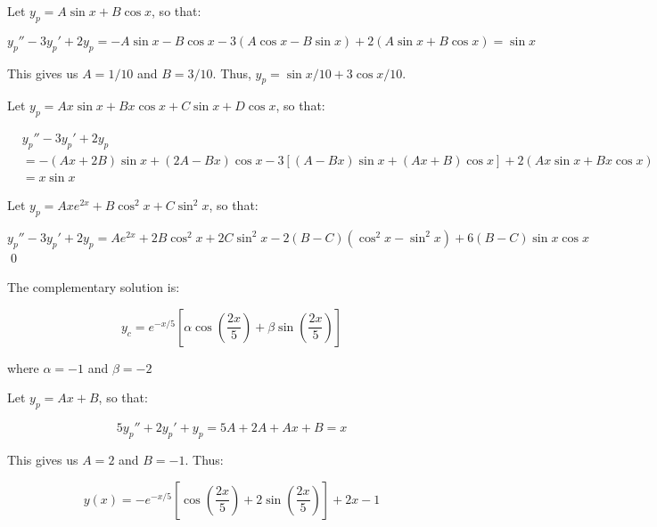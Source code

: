 \documentclass[12pt]{article}
\begin{document}
Let $y_{p} = A\sin{x} + B\cos{x}$, so that:

\begin{equation}
    y_{p}'' - 3y_{p}' + 2y_{p} = -A\sin{x} - B\cos{x} - 3(A\cos{x} - B\sin{x}) + 2(A\sin{x} + B\cos{x}) = \sin{x}
\end{equation}

This gives us $A = 1/10$ and $B = 3/10$. Thus, $y_{p} = \sin{x}/10 + 3\cos{x}/10$.

Let $y_{p} = Ax \sin{x} + Bx \cos{x} + C\sin{x} + D\cos{x}$, so that:

\begin{equation}
    \begin{split}
        &y_{p}'' - 3y_{p}' + 2y_{p} \\
        &= -(Ax + 2B)\sin{x} + (2A - Bx)\cos{x} - 3\left[ (A - Bx)\sin{x} + (Ax + B)\cos{x} \right] + 2(Ax \sin{x} + Bx \cos{x}) \\
        &= x \sin{x}
    \end{split}
\end{equation}

Let $y_{p} = Axe^{2x} + B\cos^{2}{x} + C\sin^{2}{x}$, so that:

\begin{equation}
    y_{p}'' - 3y_{p}' + 2y_{p} = Ae^{2x} + 2B\cos^{2}{x} + 2C\sin^{2}{x} - 2(B - C)(\cos^{2}{x} - \sin^{2}{x}) + 6(B - C)\sin{x}\cos{x}
\end{equation}
\qed



The complementary solution is:

\begin{equation}
    y_{c} = e^{-x/5}\left[ \alpha \cos{\left( \frac{2x}{5} \right)} + \beta \sin{\left( \frac{2x}{5} \right)} \right]
\end{equation}

where $\alpha = -1$ and $\beta = -2$

Let $y_{p} = Ax + B$, so that:

\begin{equation}
    5y_{p}'' + 2y_{p}' + y_{p} = 5A  + 2A + Ax + B = x
\end{equation}

This gives us $A = 2$ and $B = -1$. Thus:

\begin{equation}
    y(x) = -e^{-x/5}\left[ \cos{\left( \frac{2x}{5} \right)} + 2\sin{\left( \frac{2x}{5} \right)} \right] + 2x - 1
\end{equation}
\end{document}
